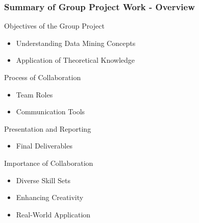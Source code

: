 \documentclass[aspectratio=169]{beamer}
\begin{document}
\begin{frame}[fragile]
    \frametitle{Summary of Group Project Work - Overview}
    \begin{block}{Objectives of the Group Project}
        \begin{itemize}
            \item Understanding Data Mining Concepts 
            \item Application of Theoretical Knowledge
        \end{itemize}
    \end{block}
    
    \begin{block}{Process of Collaboration}
        \begin{itemize}
            \item Team Roles
            \item Communication Tools
        \end{itemize}
    \end{block}
    
    \begin{block}{Presentation and Reporting}
        \begin{itemize}
            \item Final Deliverables
        \end{itemize}
    \end{block}
    
    \begin{block}{Importance of Collaboration}
        \begin{itemize}
            \item Diverse Skill Sets
            \item Enhancing Creativity
            \item Real-World Application
        \end{itemize}
    \end{block}
\end{frame}
\end{document}
